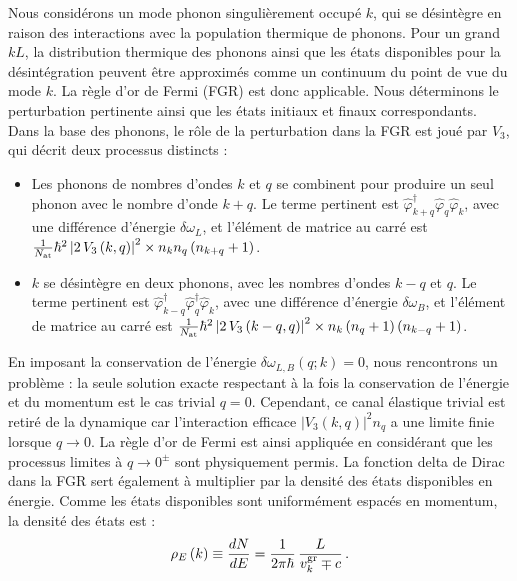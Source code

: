 \documentclass[aps,prd,notitlepage,amsfonts,amssymb,amsmath,nofootinbib,superscriptaddress,longbibliography]{revtex4-2}
\newcommand{\resumefr}[1]{\textcolor{resumecolor}{#1}}
\begin{document}
\resumefr{
Nous considérons un mode phonon singulièrement occupé \(k\), qui se désintègre en raison des interactions avec la population thermique de phonons. Pour un grand \(kL\), la distribution thermique des phonons ainsi que les états disponibles pour la désintégration peuvent être approximés comme un continuum du point de vue du mode \(k\). La règle d'or de Fermi (FGR) est donc applicable. Nous déterminons le perturbation pertinente ainsi que les états initiaux et finaux correspondants.
Dans la base des phonons, le rôle de la perturbation dans la FGR est joué par \(\hat{V}_{3}\), qui décrit deux processus distincts :
\begin{itemize}
    \item Les phonons de nombres d'ondes \(k\) et \(q\) se combinent pour produire un seul phonon avec le nombre d'onde \(k+q\). Le terme pertinent est \(\hat{\varphi}_{k+q}^{\dagger}\hat{\varphi}_{q}\hat{\varphi}_{k}\), avec une différence d'énergie \(\delta \omega_{L}\), et l'élément de matrice au carré est \(\frac{1}{N_{\rm at}} \hbar^{2} \left|2\, V_3\left(k,q\right)\right|^{2} \times n_{k} n_{q} \left(n_{k+q}+1\right)\).
    \item \(k\) se désintègre en deux phonons, avec les nombres d'ondes \(k-q\) et \(q\). Le terme pertinent est \(\hat{\varphi}_{k-q}^{\dagger}\hat{\varphi}_{q}^{\dagger}\hat{\varphi}_{k}\), avec une différence d'énergie \(\delta \omega_{B}\), et l'élément de matrice au carré est \(\frac{1}{N_{\rm at}} \hbar^{2} \left|2 \, V_3\left(k-q,q\right)\right|^{2} \times n_{k} \left(n_{q}+1\right) \left(n_{k-q}+1\right)\).
\end{itemize}
En imposant la conservation de l'énergie \(\delta\omega_{L , B} \left( q;k \right) = 0\), nous rencontrons un problème : la seule solution exacte respectant à la fois la conservation de l'énergie et du momentum est le cas trivial \(q=0\). Cependant, ce canal élastique trivial est retiré de la dynamique car l'interaction efficace \(\left| V_{3}(k,q) \right|^2 n_{q}\) a une limite finie lorsque \(q \to 0\). La règle d'or de Fermi est ainsi appliquée en considérant que les processus limites à \(q \to 0^{\pm}\) sont physiquement permis.
La fonction delta de Dirac dans la FGR sert également à multiplier par la densité des états disponibles en énergie. Comme les états disponibles sont uniformément espacés en momentum, la densité des états est :
\begin{equation*}
    \rho_{E}\left(k\right) \equiv \frac{dN}{dE} = \frac{1}{2\pi\hbar} \, \frac{L}{v^{\rm gr}_k \mp c} \,.
\end{equation*}
}
\end{document}
